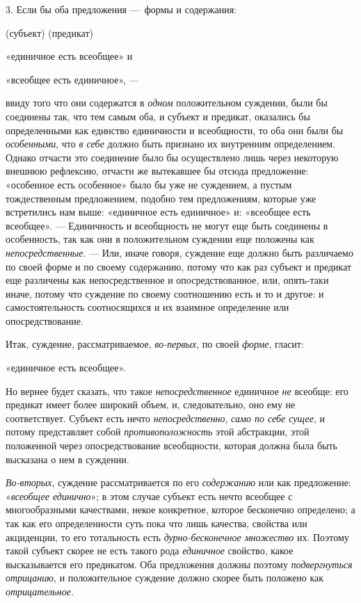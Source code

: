 \documentclass[twoside]{article}
\begin{document}
{{{{3. Если бы оба предложения —~формы и
содержания:\label{bkm:bm34a}}

(субъект) (предикат)

«единичное есть всеобщее» и

«всеобщее есть единичное», —

ввиду того что они содержатся в
{\em одном} положительном
суждении, были бы соединены так, что тем самым оба, и субъект и предикат,
оказались бы определенными как единство единичности и всеобщности, то оба
они были бы {\em особенными},
что {\em в себе}
должно быть признано их внутренним определением. Однако
отчасти это соединение было бы осуществлено лишь через некоторую внешнюю
рефлексию, отчасти же вытекавшее бы отсюда предложение: «особенное есть
особенное» было бы уже не суждением, а пустым тождественным предложением,
подобно тем предложениям, которые уже встретились нам выше: «единичное есть
единичное» и: «всеобщее есть всеобщее». — Единичность и
всеобщность не могут еще быть соединены в особенность, так как они в
положительном суждении еще положены как
{\em непосредственные}. —
Или, иначе говоря, суждение еще должно быть различаемо по
своей форме и по своему содержанию, потому что как раз субъект и предикат
еще различены как непосредственное и опосредствованное, или, опять-таки
иначе, потому что суждение по своему соотношению есть и то и другое: и
самостоятельность соотносящихся и их взаимное определение или
опосредствование.

Итак, суждение, рассматриваемое,
{\em во-первых}, по своей
{\em форме}, гласит:

«единичное есть всеобщее».

Но вернее будет сказать, что такое
{\em непосредственное}
единичное {\em не}
всеобще: его предикат имеет более широкий объем, и,
следовательно, оно ему не соответствует. Субъект есть нечто
{\em непосредственно},
{\em само по себе сущее},
и потому представляет собой
{\em противоположность}
этой абстракции, этой положенной через опосредствование
всеобщности, которая должна была быть высказана о нем в суждении.

{\em Во-вторых}, суждение
рассматривается по его {\em содержанию}
или как предложение:
«{\em всеобщее единично}»;
в этом случае субъект есть нечто всеобщее с многообразными
качествами, некое конкретное, которое бесконечно определено; а так как его
определенности суть пока что лишь качества, свойства или акциденции, то его
тотальность есть {\em дурно-бесконечное
множество} их. Поэтому такой субъект скорее не есть такого
рода {\em единичное}
свойство, какое высказывается его предикатом. Оба предложения
должны поэтому {\em подвергнуться
отрицанию}, и положительное суждение должно скорее быть
положено как {\em отрицательное}.

}}}
\end{document}
